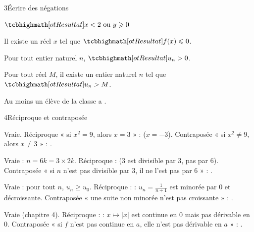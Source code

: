\begin{deuxcolonnes}
\begin{corrige}{3}{Écrire des négations}
\begin{questions}
  \item $\res{x<2\text{ ou }y\geq0}$
  \item Il existe un réel $x$ tel que $\res{f(x)\leq0}$.
  \item Pour tout entier naturel $n$, $\res{u_n>0}$.
  \item Pour tout réel $M$, il existe un entier naturel $n$ tel que $\res{u_n>M}$.
  \item Au moins un élève de la classe a .
\end{questions}
\end{corrige}

\begin{corrige}{4}{Réciproque et contraposée}
\begin{questions}
  \item Vraie. Réciproque « si $x^{2}=9$, alors $x=3$ » :  ($x=-3$). Contraposée « si $x^{2}\neq9$, alors
    $x\neq3$ » : .
  \item Vraie : $n=6k=3\times2k$. Réciproque :  ($3$ est divisible par $3$, pas par $6$). Contraposée « si $n$
    n'est pas divisible par $3$, il ne l'est pas par $6$ » : .
  \item Vraie : pour tout $n$, $u_n\geq u_0$. Réciproque :  : $u_n=\frac1{n+1}$ est minorée par $0$ et
    décroissante. Contraposée « une suite non minorée n'est pas croissante » : .
  \item Vraie (chapitre 4). Réciproque :  : $x\mapsto|x|$ est continue en $0$ mais pas dérivable en $0$.
    Contraposée « si $f$ n'est pas continue en $a$, elle n'est pas dérivable en $a$ » : .
\end{questions}
\end{corrige}


\end{deuxcolonnes}

